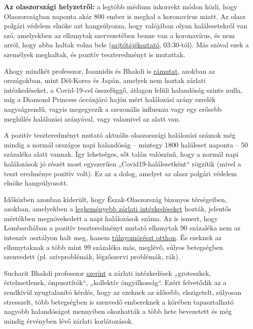 \textbf{Az olaszországi helyzetről:} a legtöbb médium inkorrekt módon
közli, hogy Olaszországban naponta akár 800 ember is meghal a
koronavírus miatt. Az olasz polgári védelem elnöke azt hangsúlyozza,
hogy valójában olyan halálesetekről van szó, amelyekben az elhunytak
szervezetében benne van a koronavírus, és nem arról, hogy abba haltak
volna bele (\href{https://youtu.be/0M4kbPDHGR0?t=210}{sajtótájékoztató},
03:30-tól). Más szóval ezek a személyek meghaltak, és pozitív
teszteredményt is mutattak.

Ahogy mindkét professzor, Ioannidis és Bhakdi is
\href{https://www.statnews.com/2020/03/17/a-fiasco-in-the-making-as-the-coronavirus-pandemic-takes-hold-we-are-making-decisions-without-reliable-data/}{rámutat},
azokban az országokban, mint Dél-Korea és Japán, amelyek nem hoztak
zárlati intézkedéseket, a Covid-19-cel összefüggő, átlagon felüli
halandóság szinte nulla, míg a Diamond Princess óceánjáró hajón mért
halálozási arány ezrelék nagyságrendű, vagyis megegyezik a szezonális
influenza vagy egy erősebb meghűlés halálozási arányával, vagy valamivel
az alatt van.

A pozitív teszteredményt mutató aktuális olaszországi halálozási számok
még mindig a normál országos napi halandóság -- mintegy 1800 haláleset
naponta -- 50 százaléka alatt vannak. Így lehetséges, sőt talán
valószínű, hogy a normál napi halálozások jó részét most egyszerűen
„Covid19-halálesetként`` rögzítik (mivel a teszt eredménye pozitív
volt). Ez az a dolog, amelyet az olasz polgári védelem elnöke
hangsúlyozott.

Időközben azonban kiderült, hogy Észak-Olaszország bizonyos térségeiben,
azokban, amelyekben a
\href{https://en.wikipedia.org/wiki/2020_Italy_coronavirus_lockdown}{legkeményebb
zárlati intézkedéseket} hozták, jelentős mértékben megnövekedett a napi
halálozások száma. Az is ismert, hogy Lombardiában a pozitív
teszteredményt mutató elhunytak 90 százaléka nem az intenzív osztályon
halt meg, hanem
\href{https://www.tgcom24.mediaset.it/cronaca/coronavirus-in-lombardia-9-morti-su-10-mai-giunti-in-terapia-intensiva_16362350-202002a.shtml}{túlnyomórészt
otthon}. És ezeknek az elhunytaknak a több mint 99 százaléka más,
meglévő, súlyos betegségben szenvedett (pl. szívproblémák, légzőszervi
problémák, rák).

Sucharit Bhakdi professzor
\href{https://www.youtube.com/watch?v=JBB9bA-gXL4}{szerint} a zárlati
intézkedések „groteszkek, értelmetlenek, önpusztítók``, „kollektív
öngyilkosság``. Ezért felvetődik az a rendkívül nyugtalanító kérdés,
hogy az ezeknek az idősebb, elszigetelt, súlyosan stresszelt, több
betegségben is szenvedő embereknek a körében tapasztalható nagyobb
halandóságot mennyiben okozhatták a több hete bevezetett és még mindig
érvényben lévő zárlati korlátozások.

